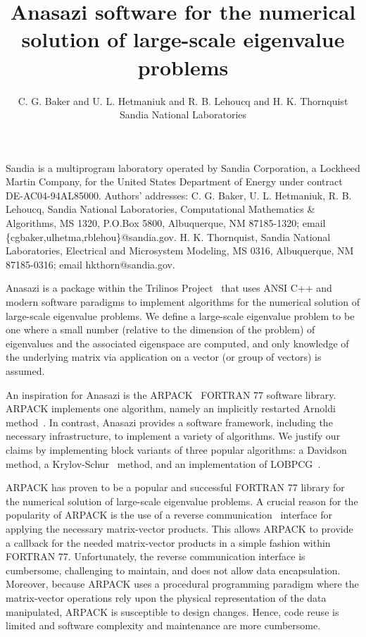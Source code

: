 \documentclass[acmtoms]{acmtrans2m}
\title{Anasazi software for the numerical solution of large-scale eigenvalue problems}
\author{C. G. Baker and
U. L. Hetmaniuk and R. B. Lehoucq and H. K. Thornquist\\ Sandia
National Laboratories}
\newcounter{algorithm}
\begin{document}
\begin{bottomstuff}
Sandia is a multiprogram laboratory operated by Sandia Corporation,
a Lockheed Martin Company, for the United States Department of
Energy under contract DE-AC04-94AL85000. Authors' addresses: C. G.
Baker, U. L. Hetmaniuk, R. B. Lehoucq,
Sandia National Laboratories, Computational Mathematics \&
Algorithms, MS 1320, P.O.Box 5800, Albuquerque, NM 87185-1320; email
\{cgbaker,ulhetma,rblehou\}@sandia.gov. H. K. Thornquist, Sandia National
Laboratories, Electrical and Microsystem Modeling, MS 0316,
Albuquerque, NM 87185-0316; email hkthorn@sandia.gov.

\end{bottomstuff}

\maketitle

Anasazi is a package within the Trilinos
Project~\cite{Heroux:2005:OTP} that uses ANSI C++ and modern software
paradigms to implement algorithms for the numerical solution of
large-scale eigenvalue problems. We define a
large-scale eigenvalue problem to be one where a small number
(relative to the dimension of the problem) of eigenvalues and the
associated eigenspace are computed, and only knowledge of the
underlying matrix via application on a vector (or group of vectors)
is assumed.

An inspiration for Anasazi is the ARPACK~\cite{lesy:98} FORTRAN 77 software library.
ARPACK implements one algorithm, namely an implicitly restarted Arnoldi
method~\cite{sore:92}. In contrast, Anasazi provides a software framework, including the
necessary infrastructure, to implement a variety of algorithms. We justify our claims by
implementing block variants of three popular algorithms: a Davidson~\cite{morganscott:86} method,
a Krylov-Schur~\cite{stew:01} method, and an implementation of LOBPCG~\cite{knya:01}.

ARPACK has proven to be a popular and successful FORTRAN 77 library
for the numerical solution of large-scale eigenvalue problems. A
crucial reason for the popularity of ARPACK is the use of a reverse
communication~\cite[p.~3]{lesy:98} interface for applying the
necessary matrix-vector products. This allows ARPACK to provide a
callback for the needed matrix-vector products in a simple fashion
within FORTRAN 77. Unfortunately, the reverse communication
interface is cumbersome, challenging to maintain, and does not allow
data encapsulation. Moreover, because ARPACK uses a procedural
programming paradigm where the matrix-vector operations rely upon
the physical representation of the data manipulated, ARPACK is
susceptible to design changes. Hence, code reuse is limited and
software complexity and maintenance are more cumbersome.
\end{document}
